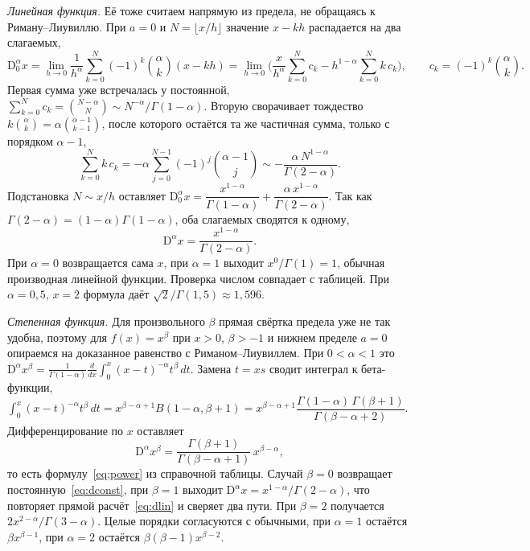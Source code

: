 \documentclass[14pt,a4paper]{extarticle}
\newcommand{\D}{\mathrm{D}}
\begin{document}
\textit{Линейная функция.} Её тоже считаем напрямую из предела, не обращаясь к Риману--Лиувиллю. При $a=0$ и $N=\lfloor x/h\rfloor$ значение $x-kh$ распадается на два слагаемых,
\[
\D^{\alpha}_{0}x=\lim_{h\to0}\frac{1}{h^{\alpha}}\sum_{k=0}^{N}(-1)^k\binom{\alpha}{k}(x-kh)
=\lim_{h\to0}\Big(\frac{x}{h^{\alpha}}\sum_{k=0}^{N}c_k-h^{1-\alpha}\sum_{k=0}^{N}k\,c_k\Big),\qquad c_k=(-1)^k\binom{\alpha}{k}.
\]
Первая сумма уже встречалась у постоянной, $\sum_{k=0}^{N}c_k=\binom{N-\alpha}{N}\sim N^{-\alpha}/\Gamma(1-\alpha)$. Вторую сворачивает тождество $k\binom{\alpha}{k}=\alpha\binom{\alpha-1}{k-1}$, после которого остаётся та же частичная сумма, только с порядком $\alpha-1$,
\[
\sum_{k=0}^{N}k\,c_k=-\alpha\sum_{j=0}^{N-1}(-1)^j\binom{\alpha-1}{j}\sim-\frac{\alpha\,N^{1-\alpha}}{\Gamma(2-\alpha)}.
\]
Подстановка $N\sim x/h$ оставляет $\D^{\alpha}_{0}x=\dfrac{x^{1-\alpha}}{\Gamma(1-\alpha)}+\dfrac{\alpha\,x^{1-\alpha}}{\Gamma(2-\alpha)}$. Так как $\Gamma(2-\alpha)=(1-\alpha)\Gamma(1-\alpha)$, оба слагаемых сводятся к одному,
\begin{equation}
\D^{\alpha}x=\frac{x^{1-\alpha}}{\Gamma(2-\alpha)}.
\label{eq:dlin}
\end{equation}
При $\alpha=0$ возвращается сама $x$, при $\alpha=1$ выходит $x^{0}/\Gamma(1)=1$, обычная производная линейной функции. Проверка числом совпадает с таблицей. При $\alpha=0{,}5$, $x=2$ формула даёт $\sqrt{2}/\Gamma(1{,}5)\approx1{,}596$.

\textit{Степенная функция.} Для произвольного $\beta$ прямая свёртка предела уже не так удобна, поэтому для $f(x)=x^{\beta}$ при $x>0$, $\beta>-1$ и нижнем пределе $a=0$ опираемся на доказанное равенство с Риманом--Лиувиллем. При $0<\alpha<1$ это $\D^{\alpha}x^{\beta}=\frac{1}{\Gamma(1-\alpha)}\frac{d}{dx}\int_0^x (x-t)^{-\alpha}t^{\beta}\,dt$. Замена $t=xs$ сводит интеграл к бета-функции, $\int_0^x(x-t)^{-\alpha}t^{\beta}\,dt=x^{\beta-\alpha+1}B(1-\alpha,\beta+1)=x^{\beta-\alpha+1}\dfrac{\Gamma(1-\alpha)\,\Gamma(\beta+1)}{\Gamma(\beta-\alpha+2)}$. Дифференцирование по $x$ оставляет
\[
\D^{\alpha}x^{\beta}=\frac{\Gamma(\beta+1)}{\Gamma(\beta-\alpha+1)}\,x^{\beta-\alpha},
\]
то есть формулу~\eqref{eq:power} из справочной таблицы. Случай $\beta=0$ возвращает постоянную~\eqref{eq:dconst}, при $\beta=1$ выходит $\D^{\alpha}x=x^{1-\alpha}/\Gamma(2-\alpha)$, что повторяет прямой расчёт~\eqref{eq:dlin} и сверяет два пути. При $\beta=2$ получается $2x^{2-\alpha}/\Gamma(3-\alpha)$. Целые порядки согласуются с обычными, при $\alpha=1$ остаётся $\beta x^{\beta-1}$, при $\alpha=2$ остаётся $\beta(\beta-1)x^{\beta-2}$.
\end{document}

